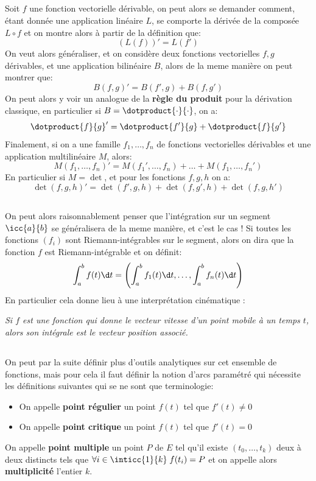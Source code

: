 \subsection*{}
Soit \(f\) une fonction vectorielle dérivable, on peut alors se demander comment, étant donnée une application linéaire \(L\), se comporte la dérivée de la composée \(L \circ f\) et on montre alors à partir de la définition que:
\[
   (L(f))' = L(f')
\] 
On veut alors généraliser, et on considère deux fonctions vectorielles \(f, g\) dérivables, et une application bilinéaire \(B\), alors de la meme manière on peut montrer que:
\[
   B(f, g)' = B(f', g) + B(f, g')
\]
On peut alors y voir un analogue de la \textbf{règle du produit} pour la dérivation classique, en particulier si \(B = \dotproduct{\cdot}{\cdot}\), on a:
\[
   \dotproduct{f}{g}' = \dotproduct{f'}{g} + \dotproduct{f}{g'}
\]
Finalement, si on a une famille \(f_1, \ldots, f_n\) de fonctions vectorielles dérivables et une application multilinéaire \(M\), alors:
\[
   M(f_1, \ldots, f_n)' = M(f_1', \ldots, f_n) + \ldots + M(f_1, \ldots, f_n')
\]
En particulier si \(M = \det\), et pour les fonctions \(f, g, h\) on a:
\[
   \det(f, g, h)' = \det(f', g, h) + \det(f, g', h) + \det(f, g, h')  
\]

\subsection*{}
On peut alors raisonnablement penser que l'intégration sur un segment \(\icc{a}{b}\) se généralisera de la meme manière, et c'est le cas ! Si toutes les fonctions \((f_i)\) sont Riemann-intégrables sur le segment, alors on dira que la fonction \(f\) est Riemann-intégrable et on définit:
\[
   \int_{a}^{b} f(t) \d t = \left(\int_{a}^{b} f_1(t) \d t, \ldots, \int_{a}^{b} f_n(t) \d t\right)   
\]
En particulier cela donne lieu à une interprétation cinématique :
\begin{center}
   \textit{Si \(f\) est une fonction qui donne le vecteur vitesse d'un point mobile à un temps \(t\), alors son intégrale est le vecteur position associé.}
\end{center}

\subsection*{}
On peut par la suite définir plus d'outils analytiques sur cet ensemble de fonctions, mais pour cela il faut définir la notion d'arcs paramétré qui nécessite les définitions suivantes qui se ne sont que terminologie:
\begin{itemize}
   \item On appelle \textbf{point régulier} un point \(f(t)\) tel que \(f'(t) \neq 0\)
   \item On appelle \textbf{point critique} un point \(f(t)\) tel que \(f'(t) = 0\)
\end{itemize}
On appelle \textbf{point multiple} un point \(P\) de \(E\) tel qu'il existe \((t_0, \ldots, t_k)\) deux à deux distincts tels que \(\forall i \in \inticc{1}{k} \; f(t_i) = P\) et on appelle alors \textbf{multiplicité} l'entier \(k\).

